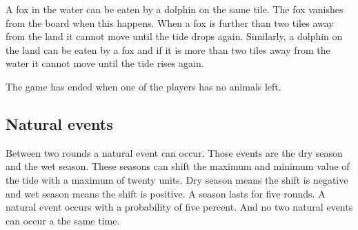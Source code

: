 \documentclass[12pt]{article}
\begin{document}
A fox in the water can be eaten by a dolphin on the same tile. The fox vanishes from the board when this happens. When a fox is further than two tiles away from the land it cannot move until the tide drops again. Similarly, a dolphin on the land can be eaten by a fox and if it is more than two tiles away from the water it cannot move until the tide rises again.

The game has ended when one of the players has no animals left.

\subsection{Natural events}
Between two rounds a natural event can occur. Those events are the dry season and the wet season. These seasons can shift the maximum and minimum value of the tide with a maximum of twenty units. Dry season means the shift is negative and wet season means the shift is positive. A season lasts for five rounds. A natural event occurs with a probability of five percent. And no two natural events can occur a the same time.
\end{document}
